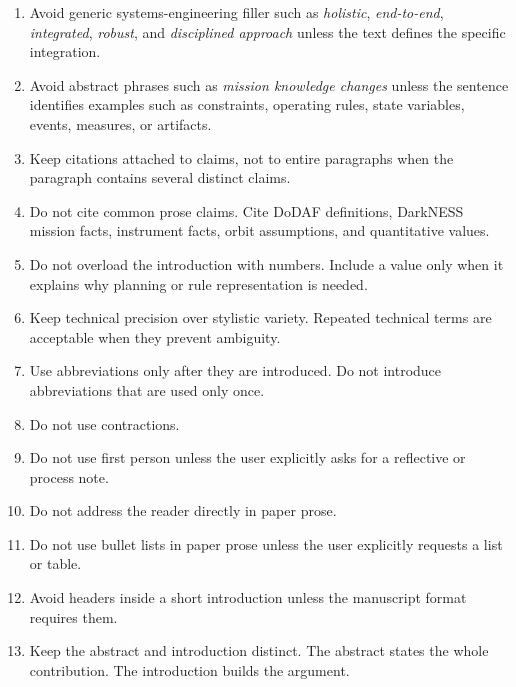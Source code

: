 \documentclass[11pt]{article}
\begin{document}
\begin{enumerate}
\item Avoid generic systems-engineering filler such as \emph{holistic}, \emph{end-to-end}, \emph{integrated}, \emph{robust}, and \emph{disciplined approach} unless the text defines the specific integration.

\item Avoid abstract phrases such as \emph{mission knowledge changes} unless the sentence identifies examples such as constraints, operating rules, state variables, events, measures, or artifacts.

\item Keep citations attached to claims, not to entire paragraphs when the paragraph contains several distinct claims.

\item Do not cite common prose claims. Cite DoDAF definitions, DarkNESS mission facts, instrument facts, orbit assumptions, and quantitative values.

\item Do not overload the introduction with numbers. Include a value only when it explains why planning or rule representation is needed.

\item Keep technical precision over stylistic variety. Repeated technical terms are acceptable when they prevent ambiguity.

\item Use abbreviations only after they are introduced. Do not introduce abbreviations that are used only once.

\item Do not use contractions.

\item Do not use first person unless the user explicitly asks for a reflective or process note.

\item Do not address the reader directly in paper prose.

\item Do not use bullet lists in paper prose unless the user explicitly requests a list or table.

\item Avoid headers inside a short introduction unless the manuscript format requires them.

\item Keep the abstract and introduction distinct. The abstract states the whole contribution. The introduction builds the argument.


\end{enumerate}
\end{document}
